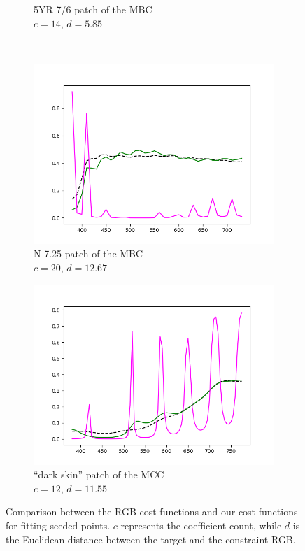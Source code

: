 \begin{figure}[t]
\begin{subfigure}[t]{0.45\textwidth}
		\caption{5YR 7/6 patch of the MBC\\$c = 14$, $d = 5.85$}
		\label{fig:resultsCostFunctions_mcb0706}
	\end{subfigure} 
	\vspace{0.5em}\\
	\begin{subfigure}[t]{0.45\textwidth}
		\includegraphics[width=\linewidth]{img/results_costFunctions_mcb0725.png}
		\caption{N 7.25 patch of the MBC\\$c = 20$, $d = 12.67$}
		\label{fig:resultsCostFunctions_mcb0725}
	\end{subfigure} \hspace{0.1em}
	\begin{subfigure}[t]{0.45\textwidth}
		\includegraphics[width=\linewidth]{img/results_costFunctions_darkskin.png}
		\caption{``dark skin'' patch of the MCC\\$c = 12$, $d = 11.55$}
		\label{fig:resultsCostFunctions_darkskin}
	\end{subfigure}
	\caption{Comparison between the RGB cost functions and our cost functions for fitting seeded points. $c$ represents the coefficient count, while $d$ is the Euclidean distance between the target and the constraint RGB.}
	\label{fig:resultsCostFunctions}
\end{figure}

